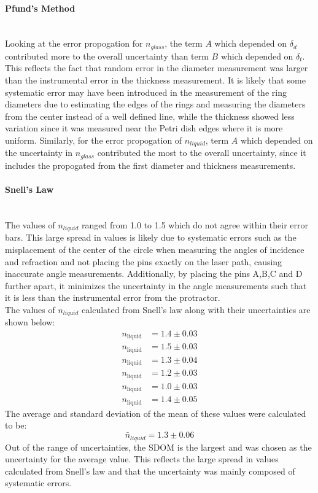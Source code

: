 \documentclass[12pt]{article}
\begin{document}
\paragraph{Pfund's Method} \mbox{}\\
Looking at the error propogation for $n_{glass}$, the term $A$ which depended on $\delta_d$ contributed more to the overall uncertainty than term $B$ which depended on $\delta_t$. This reflects the fact that random error in the diameter measurement was larger than the instrumental error in the thickness measurement. It is likely that some systematic error may have been introduced in the measurement of the ring diameters due to estimating the edges of the rings and measuring the diameters from the center instead of a well defined line, while the thickness showed less variation since it was measured near the Petri dish edges where it is more uniform. Similarly, for the error propogation of $n_{liquid}$, term $A$ which depended on the uncertainty in $n_{glass}$ contributed the most to the overall uncertainty, since it includes the propogated from the first diameter and thickness measurements.

\paragraph{Snell's Law} \mbox{}\\
The values of $n_{liquid}$ ranged from 1.0 to 1.5 which do not agree within their error bars. This large spread in values is likely due to systematic errors such as the misplacement of the center of the circle when measuring the angles of incidence and refraction and not placing the pins exactly on the laser path, causing inaccurate angle measurements. Additionally, by placing the pins A,B,C and D further apart, it minimizes the uncertainty in the angle measurements such that it is less than the instrumental error from the protractor.\\
The values of $n_{liquid}$ calculated from Snell's law along with their uncertainties are shown below:
\begin{align*}
n_{\text{liquid}} &= 1.4 \pm 0.03 \\
n_{\text{liquid}} &= 1.5 \pm 0.03 \\
n_{\text{liquid}} &= 1.3 \pm 0.04 \\
n_{\text{liquid}} &= 1.2 \pm 0.03 \\
n_{\text{liquid}} &= 1.0 \pm 0.03 \\
n_{\text{liquid}} &= 1.4 \pm 0.05
\end{align*}
The average and standard deviation of the mean of these values were calculated to be:
\[\bar{n}_{liquid} = 1.3 \pm 0.06\]
Out of the range of uncertainties, the SDOM is the largest and was chosen as the uncertainty for the average value. This reflects the large spread in values calculated from Snell's law and that the uncertainty was mainly composed of systematic errors.
\end{document}
